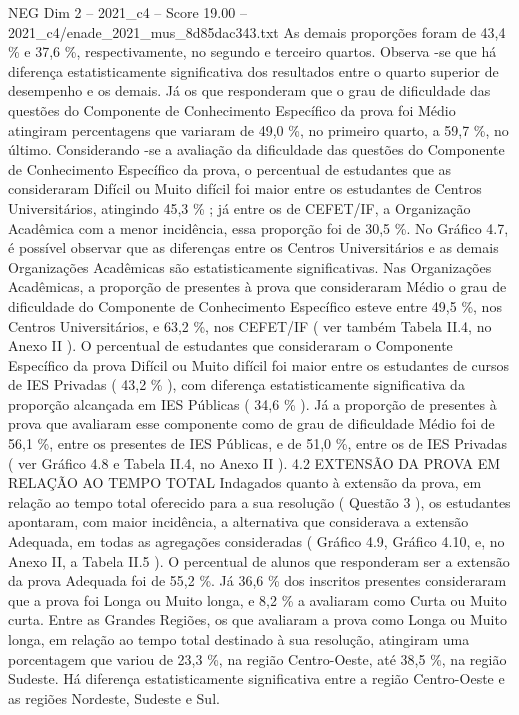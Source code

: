 \begin{textsample}{NEG Dim 2 – 2021\_c4 – Score 19.00 – 2021\_c4/enade\_2021\_mus\_8d85dac343.txt}
As demais proporções foram de 43,4 \% e 37,6 \%, respectivamente, no segundo e terceiro quartos.
Observa -se que há diferença estatisticamente significativa dos resultados entre o quarto superior de desempenho e os demais.
Já os que responderam que o grau de dificuldade das questões do Componente de Conhecimento Específico da prova foi Médio atingiram percentagens que variaram de 49,0 \%, no primeiro quarto, a 59,7 \%, no último.
Considerando -se a avaliação da dificuldade das questões do Componente de Conhecimento Específico da prova, o percentual de estudantes que as consideraram Difícil ou Muito difícil foi maior entre os estudantes de Centros Universitários, atingindo 45,3 \% ; já entre os de CEFET/IF, a Organização Acadêmica com a menor incidência, essa proporção foi de 30,5 \%.
No Gráfico 4.7, é possível observar que as diferenças entre os Centros Universitários e as demais Organizações Acadêmicas são estatisticamente significativas.
Nas Organizações Acadêmicas, a proporção de presentes à prova que consideraram Médio o grau de dificuldade do Componente de Conhecimento Específico esteve entre 49,5 \%, nos Centros Universitários, e 63,2 \%, nos CEFET/IF ( ver também Tabela II.4, no Anexo II ).
O percentual de estudantes que consideraram o Componente Específico da prova Difícil ou Muito difícil foi maior entre os estudantes de cursos de IES Privadas ( 43,2 \% ), com diferença estatisticamente significativa da proporção alcançada em IES Públicas ( 34,6 \% ).
Já a proporção de presentes à prova que avaliaram esse componente como de grau de dificuldade Médio foi de 56,1 \%, entre os presentes de IES Públicas, e de 51,0 \%, entre os de IES Privadas ( ver Gráfico 4.8 e Tabela II.4, no Anexo II ). 4.2 EXTENSÃO DA PROVA EM RELAÇÃO AO TEMPO TOTAL Indagados quanto à extensão da prova, em relação ao tempo total oferecido para a sua resolução ( Questão 3 ), os estudantes apontaram, com maior incidência, a alternativa que considerava a extensão Adequada, em todas as agregações consideradas ( Gráfico 4.9, Gráfico 4.10, e, no Anexo II, a Tabela II.5 ).
O percentual de alunos que responderam ser a extensão da prova Adequada foi de 55,2 \%.
Já 36,6 \% dos inscritos presentes consideraram que a prova foi Longa ou Muito longa, e 8,2 \% a avaliaram como Curta ou Muito curta.
Entre as Grandes Regiões, os que avaliaram a prova como Longa ou Muito longa, em relação ao tempo total destinado à sua resolução, atingiram uma porcentagem que variou de 23,3 \%, na região Centro-Oeste, até 38,5 \%, na região Sudeste.
Há diferença estatisticamente significativa entre a região Centro-Oeste e as regiões Nordeste, Sudeste e Sul.

\end{textsample}
